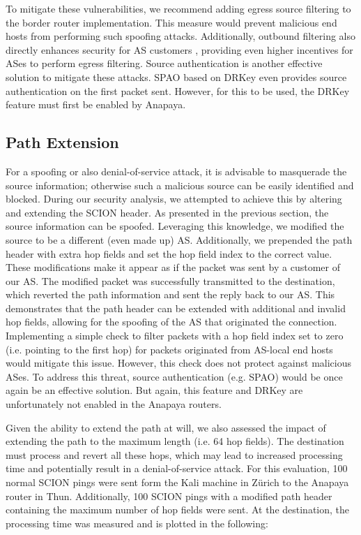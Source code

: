 To mitigate these vulnerabilities, we recommend adding egress source filtering to the border router implementation.
This measure would prevent malicious end hosts from performing such spoofing attacks.
Additionally, outbound filtering also directly enhances security for AS customers \cite[Section 7.7.3]{Perrig2022}, providing even higher incentives for ASes to perform egress filtering.
Source authentication is another effective solution to mitigate these attacks.
SPAO based on DRKey even provides source authentication on the first packet sent.
However, for this to be used, the DRKey feature must first be enabled by Anapaya.




\subsection{Path Extension}
For a spoofing or also denial-of-service attack, it is advisable to masquerade the source information; otherwise such a malicious source can be easily identified and blocked.
During our security analysis, we attempted to achieve this by altering and extending the SCION header.
As presented in the previous section, the source information can be spoofed.
Leveraging this knowledge, we modified the source to be a different (even made up) AS.
Additionally, we prepended the path header with extra hop fields and set the hop field index to the correct value.
These modifications make it appear as if the packet was sent by a customer of our AS.
The modified packet was successfully transmitted to the destination, which reverted the path information and sent the reply back to our AS.
This demonstrates that the path header can be extended with additional and invalid hop fields, allowing for the spoofing of the AS that originated the connection.
Implementing a simple check to filter packets with a hop field index set to zero (i.e. pointing to the first hop) for packets originated from AS-local end hosts would mitigate this issue.
However, this check does not protect against malicious ASes.
To address this threat, source authentication (e.g. SPAO) would be once again be an effective solution.
But again, this feature and DRKey are unfortunately not enabled in the Anapaya routers.

Given the ability to extend the path at will, we also assessed the impact of extending the path to the maximum length (i.e. 64 hop fields).
The destination must process and revert all these hops, which may lead to increased processing time and potentially result in a denial-of-service attack.
For this evaluation, 100 normal SCION pings were sent form the Kali machine in Zürich to the Anapaya router in Thun.
Additionally, 100 SCION pings with a modified path header containing the maximum number of hop fields were sent.
At the destination, the processing time was measured and is plotted in the following:

